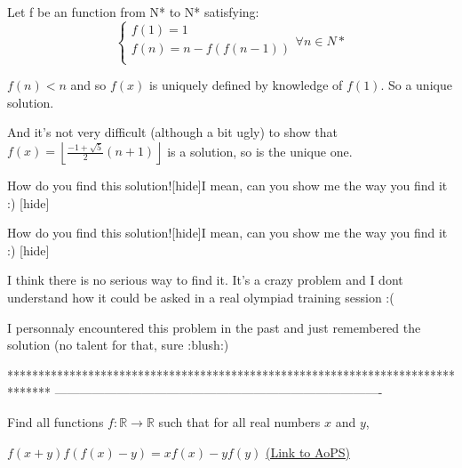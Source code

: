 \begin{solution}
	\begin{tcolorbox}Let f be an function from N* to N* satisfying:
\[\left\{ {\begin{array}{*{20}{c}}
   {f(1) = 1}  \\
   {f(n) = n - f(f(n - 1))}  \\
\end{array}\forall n \in} N* \right.\]\end{tcolorbox}

$f(n)<n$ and so $f(x)$ is uniquely defined by knowledge of $f(1)$.
So a unique solution.

And it's not very difficult (although a bit ugly) to show that $\boxed{f(x)=\left\lfloor\frac{-1+\sqrt 5}2(n+1)\right\rfloor}$ is a solution, so is the unique one.
\end{solution}



\begin{solution}
	How do you find this solution![hide]I mean, can you show me the way you find it :) [\/hide]
\end{solution}



\begin{solution}
	\begin{tcolorbox}How do you find this solution![hide]I mean, can you show me the way you find it :) [\/hide]\end{tcolorbox}
I think there is no serious way to find it.
It's a crazy problem and I dont understand how it could be asked in a real olympiad training session :(

I personnaly encountered this problem in the past and just remembered the solution (no talent for that, sure :blush:)
\end{solution}
*******************************************************************************
-------------------------------------------------------------------------------

\begin{problem}
	Find all functions $f:\mathbb R \longrightarrow \mathbb R$ such that for all real numbers $x$ and $y$,

$f(x+y)f(f(x)-y)=xf(x)-yf(y)$
	\flushright \href{https://artofproblemsolving.com/community/c6h474512}{(Link to AoPS)}
\end{problem}



